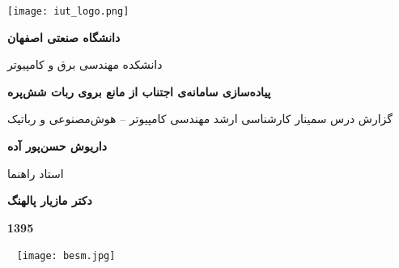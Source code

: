 


\thispagestyle{empty}
\begin{center}
\texttt{[image: iut\_logo.png]}
\vspace{0.4cm}

\textbf{دانشگاه صنعتی اصفهان}\\
\vspace{0.4cm}

{\large

	دانشکده مهندسی برق و کامپیوتر
}
\vspace{3.5cm}

{\Large
	\textbf{پیاده‌سازی سامانه‌ی اجتناب از مانع بروی ربات شش‌پره}\\
}
\vspace{3.5cm}

{\Large
	گزارش درس سمینار کارشناسی ارشد مهندسی کامپیوتر -- هوش‌مصنوعی و رباتیک\\
}
\vspace{1cm}

{\large
	\textbf{داریوش حسن‌پور آده}\\
}
\vspace{3.5cm}

{\large
	استاد راهنما\\
}
\vspace{0.5cm}

{\large
	\textbf{دکتر مازیار پالهنگ}\\
}
\vspace{4cm}

\textbf{1395}

\end{center}
\restoregeometry
\pagebreak

\thispagestyle{empty}
\begin{center}
	~\vfill
	\texttt{[image: besm.jpg]}
	~\vfill
\end{center}
\pagebreak

